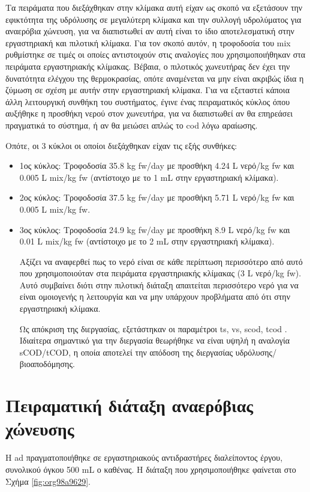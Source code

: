 \documentclass[11pt]{report}
\begin{document}
Τα πειράματα που διεξάχθηκαν στην κλίμακα αυτή είχαν ως σκοπό να εξετάσουν την εφικτότητα της υδρόλυσης σε μεγαλύτερη κλίμακα και την συλλογή υδρολύματος για αναερόβια χώνευση, για να διαπιστωθεί αν αυτή είναι το ίδιο αποτελεσματική στην εργαστηριακή και πιλοτική κλίμακα. Για τον σκοπό αυτόν, η τροφοδοσία του \acrshort{mix} ρυθμίστηκε σε τιμές οι οποίες αντιστοιχούν στις αναλογίες που χρησιμοποιήθηκαν στα πειράματα εργαστηριακής κλίμακας. Βέβαια, ο πιλοτικός χωνευτήρας δεν έχει την δυνατότητα ελέγχου της θερμοκρασίας, οπότε αναμένεται να μην είναι ακριβώς ίδια η ζύμωση σε σχέση με αυτήν στην εργαστηριακή κλίμακα. Για να εξεταστεί κάποια άλλη λειτουργική συνθήκη του συστήματος, έγινε ένας πειραματικός κύκλος όπου αυξήθηκε η προσθήκη νερού στον χωνευτήρα, για να διαπιστωθεί αν θα επηρεάσει πραγματικά το σύστημα, ή αν θα μειώσει απλώς το \acrshort{cod} λόγω αραίωσης.

Οπότε, οι 3 κύκλοι οι οποίοι διεξάχθηκαν είχαν τις εξής συνθήκες:
\begin{itemize}
\item 1ος κύκλος: Τροφοδοσία 35.8 kg \acrshort{fw}/day με προσθήκη 4.24 L νερό/kg \acrshort{fw} και 0.005 L \acrshort{mix}/kg \acrshort{fw} (αντίστοιχο με το 1 mL στην εργαστηριακή κλίμακα).
\item 2ος κύκλος: Τροφοδοσία 37.5 kg \acrshort{fw}/day με προσθήκη 5.71 L νερό/kg \acrshort{fw} και 0.005 L \acrshort{mix}/kg \acrshort{fw}.
\item 3ος κύκλος: Τροφοδοσία 24.9 kg \acrshort{fw}/day με προσθήκη 8.9 L νερό/kg \acrshort{fw} και 0.01 L \acrshort{mix}/kg \acrshort{fw} (αντίστοιχο με το 2 mL στην εργαστηριακή κλίμακα).

Αξίζει να αναφερθεί πως το νερό είναι σε κάθε περίπτωση περισσότερο από αυτό που χρησιμοποιούταν στα πειράματα εργαστηριακής κλίμακας (3 L νερό/kg \acrshort{fw}). Αυτό συμβαίνει διότι στην πιλοτική διάταξη απαιτείται περισσότερο νερό για να είναι ομοιογενής η λειτουργία και να μην υπάρχουν προβλήματα από ότι στην εργαστηριακή κλίμακα.

Ως απόκριση της διεργασίας, εξετάστηκαν οι παραμέτροι \acrshort{ts}, \acrshort{vs}, \acrshort{scod}, \acrshort{tcod} . Ιδιαίτερα σημαντικό για την διεργασία θεωρήθηκε να είναι υψηλή η αναλογία sCOD/tCOD, η οποία αποτελεί την απόδοση της διεργασίας υδρόλυσης/βιοαποδόμησης.
\end{itemize}

\section{Πειραματική διάταξη αναερόβιας χώνευσης}
\label{sec:org1521e2f}
Η \acrshort{ad} πραγματοποιήθηκε σε εργαστηριακούς αντιδραστήρες διαλείποντος έργου, συνολικού όγκου 500 mL ο καθένας. Η διάταξη που χρησιμοποιήθηκε φαίνεται στο Σχήμα \ref{fig:org98a9629}.
\end{document}
